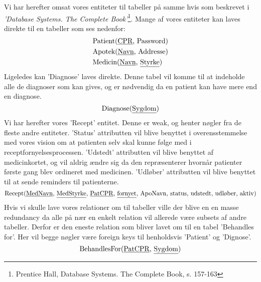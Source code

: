 Vi har herefter omsat vores entiteter til tabeller på samme hvis som beskrevet i \textit{'Database Systems. The Complete Book'}\footnote{Prentice Hall, Database Systems. The Complete Book, s. 157-163}. Mange af vores entiteter kan laves direkte til en tabeller som ses nedenfor:
\begin{align*}
	&\textrm{Patient}(\textrm{\underline{CPR}, Password})\\
	&\textrm{Apotek}(\textrm{\underline{Navn}, Addresse})\\
	&\textrm{Medicin}(\textrm{\underline{Navn}, \underline{Styrke}})\\
\end{align*}
Ligeledes kan 'Diagnose' laves direkte. Denne tabel vil komme til at indeholde alle de diagnoser som kan gives, og er nødvendig da en patient kan have mere end en diagnose.
\begin{equation*}
\textrm{Diagnose}(\textrm{\underline{Sygdom}})
\end{equation*}
Vi har herefter vores 'Recept' entitet. Denne er weak, og henter nøgler fra de fleste andre entiteter. 'Status' attributten vil blive benyttet i overensstemmelse med vores vision om at patienten selv skal kunne følge med i receptfornyelsesprocessen. 'Udstedt' attributten vil blive benyttet af medicinkortet, og vil aldrig ændre sig da den repræsenterer hvornår patienter første gang blev ordineret med medicinen. 'Udløber' attributten vil blive benyttet til at sende reminders til patienterne. 
\begin{equation*}
	\textrm{Recept}(\textrm{\underline{MedNavn}, \underline{MedStyrke}, \underline{PatCPR}, \underline{fornyet}, ApoNavn, status, udstedt, udløber, aktiv})
\end{equation*}
Hvis vi skulle lave vores relationer om til tabeller ville der blive en en masse redundancy da alle på nær en enkelt relation vil allerede være subsets af andre tabeller. Derfor er den eneste relation som bliver lavet om til en tabel 'Behandles for'. Her vil begge nøgler være foreign keys til henholdsvis 'Patient' og 'Dignose'.
\begin{equation*}
\textrm{BehandlesFor}(\textrm{\underline{PatCPR}, \underline{Sygdom}})
\end{equation*}
